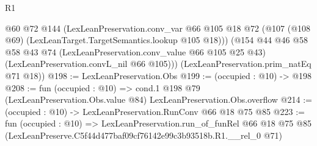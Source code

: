 \begin{lexlean}{R1}
\begin{coremodule}
        @60
        @72
        @144
        (LexLeanPreservation.conv_var
          @66
          @105
          @18
          @72
          (@107 (@108 @69) (LexLeanTarget.TargetSemantics.lookup @105 @18)))
        (@154
          @44
          @46
          @58
          @58
          @43
          @74
          (LexLeanPreservation.conv_value @66 @105 @25 @43)
          (LexLeanPreservation.convL_nil @66 @105)))
      (LexLeanPreservation.prim_natEq @71 @18))
@198 := LexLeanPreservation.Obs
@199 := (occupied : @10) -> @198
@208 := fun (occupied : @10) =>
  cond.{1} @198 @79 (LexLeanPreservation.Obs.value @84) LexLeanPreservation.Obs.overflow
@214 := (occupied : @10) -> LexLeanPreservation.RunConv @66 @18 @75 @85
@223 := fun (occupied : @10) =>
  LexLeanPreservation.run_of_funRel
    @66
    @18
    @75
    @85
    (LexLeanPreserve.C5f44d477baf09cf76142e99c3b93518b.R1.__rel_0 @71)
\end{coremodule}
\end{lexlean}
